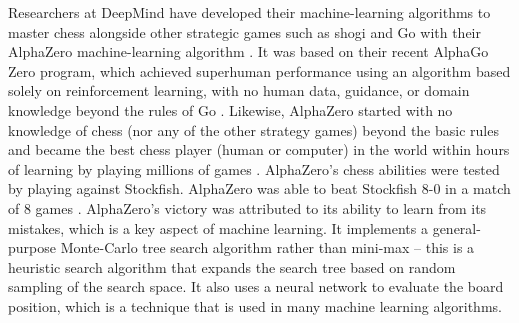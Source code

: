 \documentclass[%
 superscriptaddress,
showpacs,preprintnumbers,
 amsmath,
 amssymb,
 aps,
 pra,
showkeys,
onecolumn,
notitlepage,
11pt,
tightenlines      %
]{revtex4-1}
\begin{document}
Researchers at DeepMind have developed their machine-learning algorithms to master chess alongside other strategic games such as shogi and Go with their AlphaZero machine-learning algorithm \cite{silver2018general}. It was based on their recent AlphaGo Zero program, which achieved superhuman performance using an algorithm based solely on reinforcement learning, with no human data, guidance, or domain knowledge beyond the rules of Go \cite{silver2017mastering}. Likewise, AlphaZero started with no knowledge of chess (nor any of the other strategy games) beyond the basic rules and became the best chess player (human or computer) in the world within hours of learning by playing millions of games \cite{strogatz2018one}. AlphaZero's chess abilities were tested by playing against Stockfish. AlphaZero was able to beat Stockfish 8-0 in a match of 8 games \cite{silver2018general}. AlphaZero's victory was attributed to its ability to learn from its mistakes, which is a key aspect of machine learning. It implements a general-purpose Monte-Carlo tree search algorithm rather than mini-max \cite{silver2017mastering2} -- this is a heuristic search algorithm that expands the search tree based on random sampling of the search space. It also uses a neural network to evaluate the board position, which is a technique that is used in many machine learning algorithms.
\end{document}
